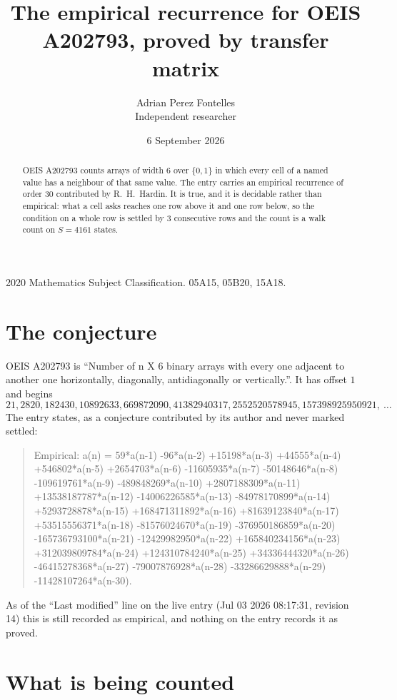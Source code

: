 \documentclass[11pt,a4paper]{article}
\title{The empirical recurrence for OEIS A202793, proved by transfer matrix}
\author{Adrian Perez Fontelles\\ \small Independent researcher}
\date{6 September 2026}
\theoremstyle{plain}
\theoremstyle{definition}
\begin{document}
\maketitle

\begin{abstract}
OEIS A202793 counts arrays of width $6$ over $\{0,1\}$ in which every cell of a named value has a neighbour of that same value. The entry carries an
empirical recurrence of order $30$ contributed by R.~H.~Hardin. It is true, and it is
decidable rather than empirical: what a cell asks reaches one row above it and one row below, so the
condition on a whole row is settled by $3$ consecutive rows and the count is a walk
count on $S=4161$ states.
\end{abstract}

\noindent\small 2020 Mathematics Subject Classification. 05A15, 05B20, 15A18.\normalsize

\section{The conjecture}

OEIS A202793 is ``Number of n X 6 binary arrays with every one adjacent to another one horizontally, diagonally, antidiagonally or vertically.''. It has offset $1$ and begins
\[
21, 2820, 182430, 10892633, 669872090, 41382940317, 2552520578945, 157398925950921,\ \dots
\]
The entry states, as a conjecture contributed by its author and never marked settled:
\begin{quote}
Empirical: a(n) = 59*a(n-1) -96*a(n-2) +15198*a(n-3) +44555*a(n-4) +546802*a(n-5) +2654703*a(n-6) -11605935*a(n-7) -50148646*a(n-8) -109619761*a(n-9) -489848269*a(n-10) +2807188309*a(n-11) +13538187787*a(n-12) -14006226585*a(n-13) -84978170899*a(n-14) +5293728878*a(n-15) +168471311892*a(n-16) +81639123840*a(n-17) +53515556371*a(n-18) -81576024670*a(n-19) -376950186859*a(n-20) -165736793100*a(n-21) -12429982950*a(n-22) +165840234156*a(n-23) +312039809784*a(n-24) +124310784240*a(n-25) +34336444320*a(n-26) -46415278368*a(n-27) -79007876928*a(n-28) -33286629888*a(n-29) -11428107264*a(n-30).
\end{quote}
As of the ``Last modified'' line on the live entry (Jul 03 2026 08:17:31, revision 14) this is still
recorded as empirical, and nothing on the entry records it as proved.

\section{What is being counted}
\end{document}
